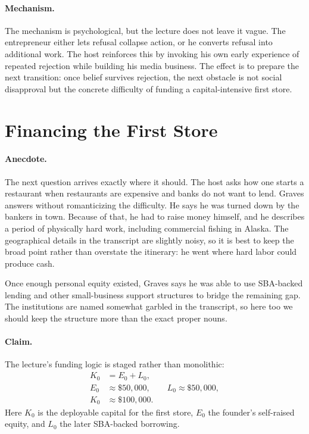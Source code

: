 \paragraph{Mechanism.}
The mechanism is psychological, but the lecture does not leave it vague. The entrepreneur either lets refusal collapse action, or he converts refusal into additional work. The host reinforces this by invoking his own early experience of repeated rejection while building his media business. The effect is to prepare the next transition: once belief survives rejection, the next obstacle is not social disapproval but the concrete difficulty of funding a capital-intensive first store.

\section{Financing the First Store}

\paragraph{Anecdote.}
The next question arrives exactly where it should. The host asks how one starts a restaurant when restaurants are expensive and banks do not want to lend. Graves answers without romanticizing the difficulty. He says he was turned down by the bankers in town. Because of that, he had to raise money himself, and he describes a period of physically hard work, including commercial fishing in Alaska. The geographical details in the transcript are slightly noisy, so it is best to keep the broad point rather than overstate the itinerary: he went where hard labor could produce cash.

Once enough personal equity existed, Graves says he was able to use SBA-backed lending and other small-business support structures to bridge the remaining gap. The institutions are named somewhat garbled in the transcript, so here too we should keep the structure more than the exact proper nouns.

\paragraph{Claim.}
The lecture's funding logic is staged rather than monolithic:
\begin{align}
K_0 &= E_0 + L_0,\\
E_0 &\approx \$50{,}000,\qquad L_0 \approx \$50{,}000,\\
K_0 &\approx \$100{,}000.
\end{align}
Here \(K_0\) is the deployable capital for the first store, \(E_0\) the founder's self-raised equity, and \(L_0\) the later SBA-backed borrowing.

